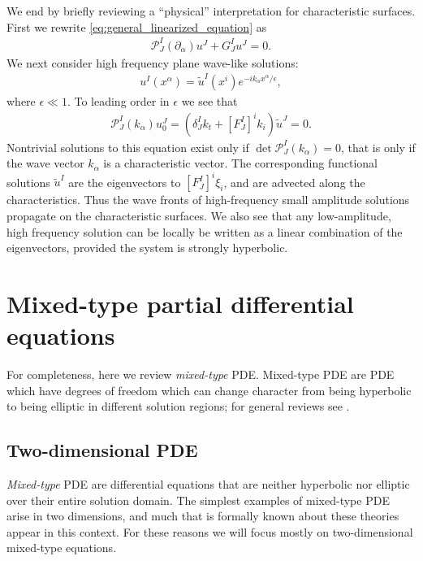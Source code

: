 \documentclass{ws-ijmpd}
\begin{document}
We end by briefly reviewing a ``physical'' interpretation for
characteristic surfaces.
First we rewrite \eqref{eq:general_linearized_equation} as
\begin{align}
   \mathcal{P}^I_J\left(\partial_{\alpha}\right)u^J
   +
   G^I_Ju^J
   =
   0
   .
\end{align}
We next consider high frequency plane wave-like solutions:
\begin{align}
   u^I(x^{\alpha})
   =
   \tilde{u}^I(x^i)e^{-ik_{\alpha}x^{\alpha}/\epsilon}
   ,
\end{align}
where $\epsilon\ll1$.
To leading order in $\epsilon$ we see that 
\begin{align}
   \mathcal{P}^I_J\left(k_{\alpha}\right)u_0^J
   =
   \left(
      \delta^I_Jk_t
      +
      \left[F^I_J\right]^ik_i
   \right)
   \tilde{u}^J
   =
   0
   .
\end{align}
Nontrivial solutions to this equation exist only if
$\det\mathcal{P}^I_J\left(k_{\alpha}\right)=0$, that is only
if the wave vector $k_{\alpha}$ is a characteristic vector.
The corresponding functional solutions $\tilde{u}^I$ are
the eigenvectors to $\left[F^I_J\right]^i\xi_i$, 
and are advected along the characteristics.
Thus the wave fronts of high-frequency small amplitude solutions
propagate on the characteristic surfaces.
We also see that
any low-amplitude, high frequency solution 
can be locally be written as a linear
combination of the eigenvectors, 
provided the system is strongly hyperbolic.

\section{Mixed-type partial differential equations
   \label{sec:mixed_type}
}

For completeness, here we review \emph{mixed-type} PDE. 
Mixed-type PDE are PDE which have degrees of freedom which
can change character from being hyperbolic to being elliptic
in different solution regions;
for general reviews see
.

\subsection{Two-dimensional PDE
   \label{sec:two_dimensional_mixed}
}
\emph{Mixed-type} PDE are differential equations
that are neither hyperbolic nor elliptic over their 
entire solution domain\cite{rassias1990lecture,otway2015elliptic}.
The simplest examples of mixed-type PDE arise in two dimensions,
and  much that is formally known about these theories appear in this context.
For these reasons we will focus mostly on two-dimensional mixed-type equations.
\end{document}
